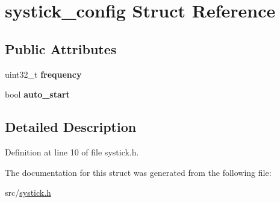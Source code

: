 \hypertarget{structsystick__config}{}\section{systick\+\_\+config Struct Reference}
\label{structsystick__config}
\subsection*{Public Attributes}
\begin{DoxyCompactItemize}
\item 
\hypertarget{structsystick__config_a4234a833cb468e5ebe169bef99cb9235}{}uint32\+\_\+t {\bfseries frequency}\label{structsystick__config_a4234a833cb468e5ebe169bef99cb9235}

\item 
\hypertarget{structsystick__config_aa9f9da280ed0e328cdd0d0648a46aaad}{}bool {\bfseries auto\+\_\+start}\label{structsystick__config_aa9f9da280ed0e328cdd0d0648a46aaad}

\end{DoxyCompactItemize}


\subsection{Detailed Description}


Definition at line 10 of file systick.\+h.



The documentation for this struct was generated from the following file\+:\begin{DoxyCompactItemize}
\item 
src/\hyperlink{systick_8h}{systick.\+h}\end{DoxyCompactItemize}
